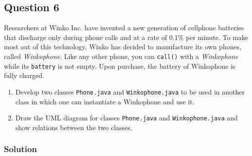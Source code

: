 \documentclass[12pt,letterpaper,twoside]{article}
\begin{document}
\subsection*{Question 6}

Researchers at Winko Inc. have invented a new generation of cellphone batteries that discharge only during phone calls and at a rate of 0.1\% per minute. To make most out of this technology, Winko has decided to manufacture its own phones, called \textit{Winkophone}. Like any other phone, you can \texttt{call()} with a \textit{Winkophone} while its \texttt{battery} is not empty. Upon purchase, the battery of Winkophone is fully charged.

\begin{enumerate}[label=(\alph*)]
\item Develop two classes \texttt{Phone.java} and \texttt{Winkophone.java} to be used in another class in which one can instantiate a Winkophone and use it.
\item Draw the UML diagram for classes \texttt{Phone.java} and \texttt{Winkophone.java} and show relations between the two classes.
\end{enumerate}

\subsubsection*{Solution}
\end{document}
